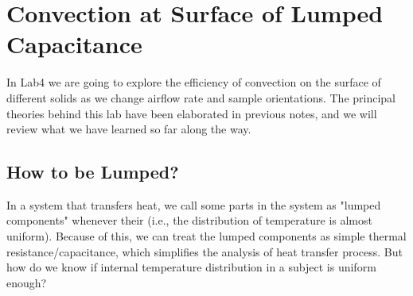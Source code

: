 \chapter{Convection at Surface of Lumped Capacitance }
In Lab4 we are going to explore the efficiency of convection on the surface of different solids as we change airflow rate and sample orientations. The principal theories behind this lab have been elaborated in previous notes, and we will review what we have learned so far along the way.
\section{How to be Lumped?}
In a system that transfers heat, we call some parts in the system as "lumped components" whenever their (i.e., the distribution of temperature is almost uniform). Because of this, we can treat the lumped components as simple thermal resistance/capacitance, which simplifies the analysis of heat transfer process. But how do we know if internal temperature distribution in a subject is uniform enough? 

